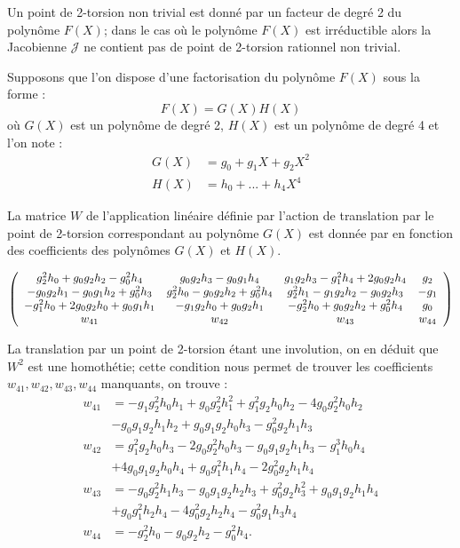 \documentclass[a4paper,12pt]{article}
\theoremstyle{definition}
\theoremstyle{remark}
\numberwithin{equation}{section}
\begin{document}
Un point de 2-torsion non trivial est donné par un facteur de degré 2 du polynôme $F(X)$; dans le cas où le polynôme $F(X)$ est irréductible alors la Jacobienne $\mathcal{J}$ ne contient pas de point de 2-torsion rationnel non trivial.

Supposons que l'on dispose d'une factorisation du polynôme $F(X)$ sous la forme :
$$F(X) = G(X)H(X)$$
où $G(X)$ est un polynôme de degré 2, $H(X)$ est un polynôme de degré 4 et l'on note :
\begin{align*}
G(X) &= g_0 + g_1X + g_2X^2 \\
H(X) &= h_0 + ... + h_4X^4
\end{align*}

La matrice $W$ de l'application linéaire définie par l'action de translation par le point de 2-torsion correspondant au polynôme $G(X)$ est donnée par \citet{eqKum} en fonction des coefficients des polynômes $G(X)$ et $H(X)$.

\[ \left(
  \begin{array}{ c c c c}
     g_2^2h_0 + g_0g_2h_2 - g_0^2h_4 & g_0g_2h_3 - g_0g_1h_4 & g_1g_2h_3 - g_1^2h_4 + 2g_0g_2h_4  & g_2  \\
     -g_0g_2h_1 - g_0g_1h_2 + g_0^2h_3 & g_2^2h_0 - g_0g_2h_2 + g_0^2h_4  & g_2^2h_1 - g_1g_2h_2 - g_0g_2h_3  & -g_1  \\
     -g_1^2h_0 + 2g_0g_2h_0 + g_0g_1h_1 & -g_1g_2h_0 + g_0g_2h_1  & -g_2^2h_0 + g_0g_2h_2 + g_0^2h_4  & g_0 \\
     w_{41} & w_{42}   & w_{43}  & w_{44}  \\
  \end{array} \right)
\]

La translation par un point de 2-torsion étant une involution, on en déduit que $W^2$ est une homothétie; cette condition nous permet de trouver les coefficients $w_{41},w_{42} ,w_{43},w_{44}$ manquants, on trouve :
\begin{align*}
w_{41} &= -g_1g_2^2h_0h_1 + g_0g_2^2h_1^2 + g_1^2g_2h_0h_2 - 4g_0g_2^2h_0h_2 \\
    &   -g_0g_1g_2h_1h_2 + g_0g_1g_2h_0h_3 - g_0^2g_2h_1h_3      \\
w_{42} &= g_1^2g_2h_0h_3 - 2g_0g_2^2h_0h_3 - g_0g_1g_2h_1h_3 - g_1^3h_0h_4 \\
    &+ 4g_0g_1g_2h_0h_4 + g_0g_1^2h_1h_4 - 2g_0^2g_2h_1h_4     \\
w_{43} &= -g_0g_2^2h_1h_3 - g_0g_1g_2h_2h_3 + g_0^2g_2h_3^2 + g_0g_1g_2h_1h_4 \\
    & + g_0g_1^2h_2h_4 - 4g_0^2g_2h_2h_4 - g_0^2g_1h_3h_4        \\        
w_{44} &= -g_2^2h_0 - g_0g_2h_2 - g_0^2h_4.
\end{align*}
\end{document}
